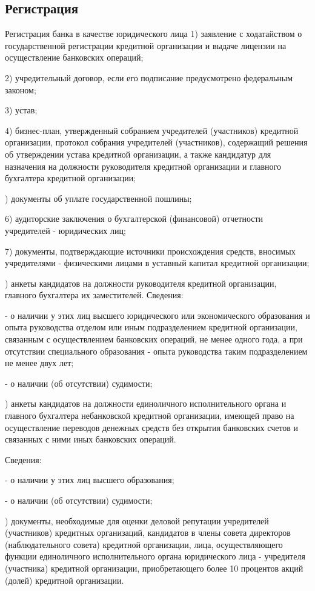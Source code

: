 \documentclass[_Banking_p1.tex]{subfiles}
\begin{document}
\subsection{Регистрация}
\begin{frame}[allowframebreaks]{Регистрация банка в качестве юридического лица}{}
1) заявление с ходатайством о государственной регистрации кредитной организации и выдаче лицензии на осуществление банковских операций;

2) учредительный договор, если его подписание предусмотрено федеральным законом;

3) устав;

\pagebreak

4) бизнес-план, утвержденный собранием учредителей (участников) кредитной организации, протокол собрания учредителей (участников), содержащий решения об утверждении устава кредитной организации, а также кандидатур для назначения на должности руководителя кредитной организации и главного бухгалтера кредитной организации;

) документы об уплате государственной пошлины;

6) аудиторские заключения о бухгалтерской (финансовой) отчетности учредителей - юридических лиц;

7) документы, подтверждающие источники происхождения средств, вносимых учредителями - физическими лицами в уставный капитал кредитной организации;

) анкеты кандидатов на должности руководителя кредитной организации, главного бухгалтера их заместителей. Сведения:

- о наличии у этих лиц высшего юридического или экономического образования и опыта руководства отделом или иным подразделением кредитной организации, связанным с осуществлением банковских операций, не менее одного года, а при отсутствии специального образования - опыта руководства таким подразделением не менее двух лет;

- о наличии (об отсутствии) судимости;

) анкеты кандидатов на должности единоличного исполнительного органа и главного бухгалтера небанковской кредитной организации, имеющей право на осуществление переводов денежных средств без открытия банковских счетов и связанных с ними иных банковских операций. 

Сведения:

- о наличии у этих лиц высшего образования;

- о наличии (об отсутствии) судимости;

) документы, необходимые для оценки деловой репутации учредителей (участников) кредитных организаций, кандидатов в члены совета директоров (наблюдательного совета) кредитной организации, лица, осуществляющего функции единоличного исполнительного органа юридического лица - учредителя (участника) кредитной организации, приобретающего более 10 процентов акций (долей) кредитной организации.

\end{frame}
\end{document}
